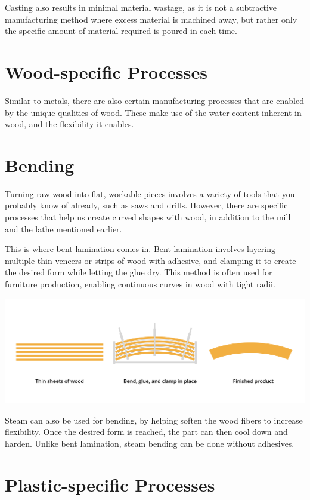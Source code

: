 Casting also results in minimal material wastage, as it is not a subtractive manufacturing method where excess material is machined away, but rather only the specific amount of material required is poured in each time.

\section{Wood-specific Processes}

Similar to metals, there are also certain manufacturing processes that are enabled by the unique qualities of wood. These make use of the water content inherent in wood, and the flexibility it enables.

\section{Bending}

Turning raw wood into flat, workable pieces involves a variety of tools that you probably know of already, such as saws and drills. However, there are specific processes that help us create curved shapes with wood, in addition to the mill and the lathe mentioned earlier.

This is where bent lamination comes in. Bent lamination involves layering multiple thin veneers or strips of wood with adhesive, and clamping it to create the desired form while letting the glue dry. This method is often used for furniture production, enabling continuous curves in wood with tight radii.

\includegraphics[width=.75\textwidth]{woodBend.png}


Steam can also be used for bending, by helping soften the wood fibers to increase flexibility. Once the desired form is reached, the part can then cool down and harden. Unlike bent lamination, steam bending can be done without adhesives.

\section{Plastic-specific Processes}

